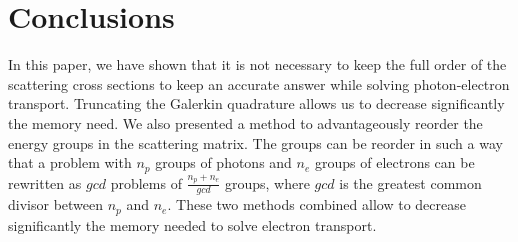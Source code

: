 \section{Conclusions}
In this paper, we have shown that it is not necessary to keep the full order of
the scattering cross sections to keep an accurate answer while solving
photon-electron transport. Truncating the Galerkin quadrature allows us to
decrease significantly the memory need. We also presented a method to
advantageously reorder the energy groups in the scattering matrix. The groups can 
be reorder in such a way that a problem with $n_p$ groups of photons and $n_e$ 
groups of electrons can be rewritten as $gcd$ problems of $\frac{n_p+n_e}{gcd}$ 
groups, where $gcd$ is the greatest common divisor between $n_p$ and $n_e$. 
These two methods combined allow to decrease significantly the memory needed to 
solve electron transport.
